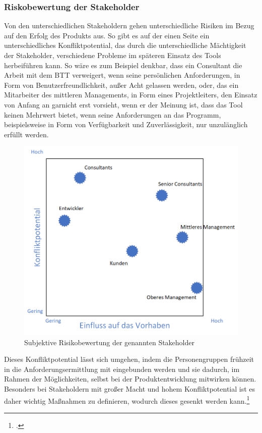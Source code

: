 \subsubsection{Riskobewertung der Stakeholder}
Von den unterschiedlichen Stakeholdern gehen unterschiedliche Risiken im Bezug auf den Erfolg des Produkts aus. So gibt es auf der einen Seite ein unterschiedliches Konfliktpotential, das durch die unterschiedliche Mächtigkeit der Stakeholder, verschiedene Probleme im späteren Einsatz des Tools herbeiführen kann. So wäre es zum Beispiel denkbar, dass ein Consultant die Arbeit mit dem BTT verweigert, wenn seine persönlichen Anforderungen, in Form von Benutzerfreundlichkeit, außer Acht gelassen werden, oder, das ein Mitarbeiter des mittleren Managements, in Form eines Projektleiters, den Einsatz von Anfang an garnicht erst vorsieht, wenn er der Meinung ist, dass das Tool keinen Mehrwert bietet, wenn seine Anforderungen an das Programm, beispielsweise in Form von Verfügbarkeit und Zuverlässigkeit, nur unzulänglich erfüllt werden.
\begin{figure}[ht]
    \centering
    \includegraphics[scale=0.67]{Bilder/stakeholderRisiko.png}
    \caption[]{Subjektive Risikobewertung der genannten Stakeholder}
\end{figure}
Dieses Konfliktpotential lässt sich umgehen, indem die Personengruppen frühzeit in die Anforderungsermittlung mit eingebunden werden und sie dadurch, im Rahmen der Möglichkeiten, selbst bei der Produktentwicklung mitwirken können. Besonders bei Stakeholdern mit großer Macht und hohem Konfliktpotential ist es daher wichtig Maßnahmen zu definieren, wodurch dieses gesenkt werden kann.\footcite[Vgl.][S. 504 f.]{balzert}



